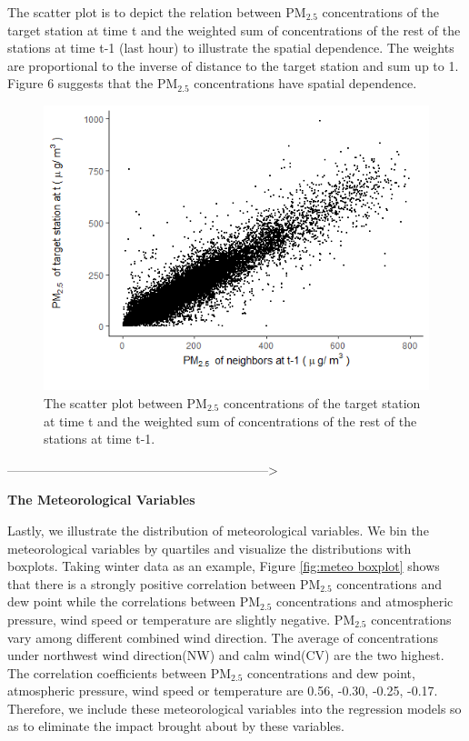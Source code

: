 \documentclass[12pt]{article}
\newcommand{\scsection}[1]
    {\begin{center}
        {\bf\large #1}
    \end{center}
    \vspace{-0.15 cm}
}
\numberwithin{equation}{section}
\begin{document}
The scatter plot is to depict the relation between PM$_{2.5}$ concentrations of the target station at time t and the weighted sum of concentrations of the rest of the stations at time t-1 (last hour) to illustrate the spatial dependence. The weights are proportional to the inverse of distance to the target station and sum up to 1. Figure 6 suggests that the PM$_{2.5}$ concentrations have spatial dependence.


\begin{figure}[htbp]
	\centering
	\includegraphics[width=12cm]{newspace.png}
	\caption{\footnotesize The scatter plot  between PM$_{2.5}$ concentrations of the target station at time t and the weighted sum of concentrations of the rest of the stations at time t-1.}
	\label{fig:space}
\end{figure}

-------------------------------------------------------------->

\scsection{The Meteorological Variables}

Lastly, we illustrate the distribution of meteorological variables. We bin the meteorological variables by quartiles and visualize the distributions with boxplots. Taking winter data as an example, Figure \ref{fig:meteo boxplot} shows that there is a strongly positive correlation between PM$_{2.5}$ concentrations and dew point while the correlations between PM$_{2.5}$ concentrations and atmospheric pressure, wind speed or temperature are slightly negative. PM$_{2.5}$ concentrations vary among different combined wind direction. The average of concentrations under northwest wind direction(NW) and calm wind(CV) are the two highest. The correlation coefficients between PM$_{2.5}$ concentrations and dew point, atmospheric pressure, wind speed or temperature are 0.56, -0.30, -0.25, -0.17. Therefore, we include these meteorological variables into the regression models so as to eliminate the impact brought about by these variables.
\end{document}
